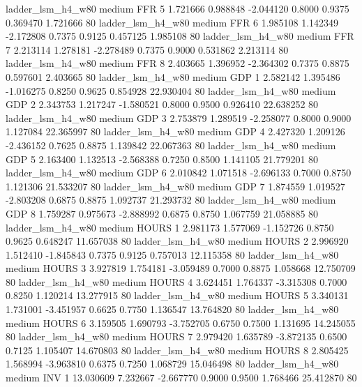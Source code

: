      ladder_lsm_h4_w80     medium      FFR                 5  1.721666 0.988848 -2.044120 0.8000 0.9375  0.369470    1.721666 80
     ladder_lsm_h4_w80     medium      FFR                 6  1.985108 1.142349 -2.172808 0.7375 0.9125  0.457125    1.985108 80
     ladder_lsm_h4_w80     medium      FFR                 7  2.213114 1.278181 -2.278489 0.7375 0.9000  0.531862    2.213114 80
     ladder_lsm_h4_w80     medium      FFR                 8  2.403665 1.396952 -2.364302 0.7375 0.8875  0.597601    2.403665 80
     ladder_lsm_h4_w80     medium      GDP                 1  2.582142 1.395486 -1.016275 0.8250 0.9625  0.854928   22.930404 80
     ladder_lsm_h4_w80     medium      GDP                 2  2.343753 1.217247 -1.580521 0.8000 0.9500  0.926410   22.638252 80
     ladder_lsm_h4_w80     medium      GDP                 3  2.753879 1.289519 -2.258077 0.8000 0.9000  1.127084   22.365997 80
     ladder_lsm_h4_w80     medium      GDP                 4  2.427320 1.209126 -2.436152 0.7625 0.8875  1.139842   22.067363 80
     ladder_lsm_h4_w80     medium      GDP                 5  2.163400 1.132513 -2.568388 0.7250 0.8500  1.141105   21.779201 80
     ladder_lsm_h4_w80     medium      GDP                 6  2.010842 1.071518 -2.696133 0.7000 0.8750  1.121306   21.533207 80
     ladder_lsm_h4_w80     medium      GDP                 7  1.874559 1.019527 -2.803208 0.6875 0.8875  1.092737   21.293732 80
     ladder_lsm_h4_w80     medium      GDP                 8  1.759287 0.975673 -2.888992 0.6875 0.8750  1.067759   21.058885 80
     ladder_lsm_h4_w80     medium    HOURS                 1  2.981173 1.577069 -1.152726 0.8750 0.9625  0.648247   11.657038 80
     ladder_lsm_h4_w80     medium    HOURS                 2  2.996920 1.512410 -1.845843 0.7375 0.9125  0.757013   12.115358 80
     ladder_lsm_h4_w80     medium    HOURS                 3  3.927819 1.754181 -3.059489 0.7000 0.8875  1.058668   12.750709 80
     ladder_lsm_h4_w80     medium    HOURS                 4  3.624451 1.764337 -3.315308 0.7000 0.8250  1.120214   13.277915 80
     ladder_lsm_h4_w80     medium    HOURS                 5  3.340131 1.731001 -3.451957 0.6625 0.7750  1.136547   13.764820 80
     ladder_lsm_h4_w80     medium    HOURS                 6  3.159505 1.690793 -3.752705 0.6750 0.7500  1.131695   14.245055 80
     ladder_lsm_h4_w80     medium    HOURS                 7  2.979420 1.635789 -3.872135 0.6500 0.7125  1.105407   14.670803 80
     ladder_lsm_h4_w80     medium    HOURS                 8  2.805425 1.568994 -3.963810 0.6375 0.7250  1.068729   15.046498 80
     ladder_lsm_h4_w80     medium      INV                 1 13.030609 7.232667 -2.667770 0.9000 0.9500  1.768466   25.412870 80
